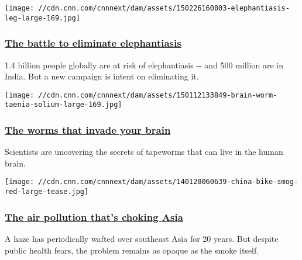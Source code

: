 \href{/2015/03/12/health/eliminating-elephantiasis-in-india/index.html}{}

\texttt{[image: //cdn.cnn.com/cnnnext/dam/assets/150226160803-elephantiasis-leg-large-169.jpg]}

\hypertarget{the-battle-to-eliminate-elephantiasis}{%
\subsubsection{\texorpdfstring{\href{/2015/03/12/health/eliminating-elephantiasis-in-india/index.html}{The
battle to eliminate
elephantiasis}}{The battle to eliminate elephantiasis}}\label{the-battle-to-eliminate-elephantiasis}}

1.4 billion people globally are at risk of elephantiasis -\/- and 500
million are in India. But a new campaign is intent on eliminating it.

\href{/2015/01/20/health/tapeworms-invade-brain/index.html}{}

\texttt{[image: //cdn.cnn.com/cnnnext/dam/assets/150112133849-brain-worm-taenia-solium-large-169.jpg]}

\hypertarget{the-worms-that-invade-your-brain}{%
\subsubsection{\texorpdfstring{\href{/2015/01/20/health/tapeworms-invade-brain/index.html}{The
worms that invade your
brain}}{The worms that invade your brain}}\label{the-worms-that-invade-your-brain}}

Scientists are uncovering the secrets of tapeworms that can live in the
human brain.

\href{/2015/01/27/asia/asia-air-pollution-haze/index.html}{}

\texttt{[image: //cdn.cnn.com/cnnnext/dam/assets/140120060639-china-bike-smog-red-large-tease.jpg]}

\hypertarget{the-air-pollution-thats-choking-asia}{%
\subsubsection{\texorpdfstring{\href{/2015/01/27/asia/asia-air-pollution-haze/index.html}{The
air pollution that's choking
Asia}}{The air pollution that's choking Asia}}\label{the-air-pollution-thats-choking-asia}}

A haze has periodically wafted over southeast Asia for 20 years. But
despite public health fears, the problem remains as opaque as the smoke
itself.

